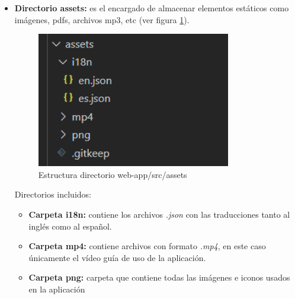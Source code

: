 \begin{itemize}
    \item \textbf{Directorio assets:} es el encargado de almacenar elementos estáticos como imágenes, pdfs, archivos mp3, etc (ver figura \ref{fig:assets_angular}).
    
    \begin{figure}[h!] 
    \centering
        \includegraphics[width=0.8\textwidth]{img/assets_angular.PNG}
    \caption{Estructura directorio web-app/src/assets}
    \label{fig:assets_angular}
    \end{figure}
    
    \newpage
    Directorios incluidos:
    
    \begin{itemize}
        \item \textbf{Carpeta i18n:} contiene los archivos \textit{.json} con las traducciones tanto al inglés como al español.
        \item \textbf{Carpeta mp4:} contiene archivos con formato \textit{.mp4}, en este caso únicamente el vídeo guía de uso de la aplicación.
        \item \textbf{Carpeta png:} carpeta que contiene todas las imágenes e iconos usados en la aplicación
    \end{itemize}
    

\end{itemize}
